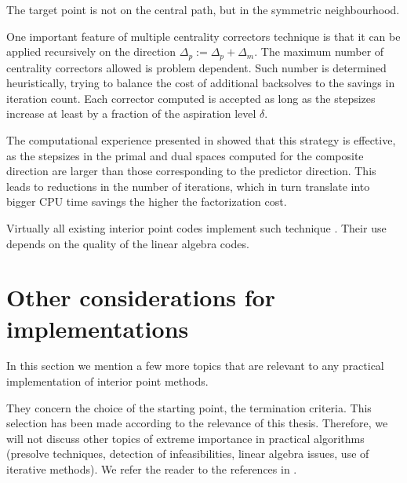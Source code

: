 The target point is not on the central path, but in the symmetric
neighbourhood.

One important feature of multiple centrality correctors technique
is that it can be applied recursively on the direction 
$\Delta_p := \Delta_p + \Delta_m$.
The maximum number of centrality correctors allowed is
problem dependent. Such number is determined 
heuristically, trying to balance the cost of additional backsolves to 
the savings in iteration count.
Each corrector computed is accepted as long as the stepsizes increase 
at least by a fraction of the aspiration level $\delta$.


The computational experience presented in \cite{Gondzio96} showed 
that this strategy is effective, as the stepsizes in the primal and 
dual spaces computed for the composite direction are larger than 
those corresponding to the predictor direction. 
This leads to reductions in the number of iterations, which in turn 
translate into bigger CPU time savings the higher the factorization
cost.

Virtually all existing interior point codes implement such technique 
\cite[Appendix B]{ipm:Wright97}.
Their use depends on the quality of the linear algebra codes.

%
%
\section{Other considerations for implementations}

In this section we mention a few more topics that are relevant to any 
practical implementation of interior point methods.

They concern the choice of the starting point, the termination
criteria. This selection has been made according to the relevance
of this thesis.
Therefore, we will not discuss other topics of extreme importance 
in practical algorithms (presolve techniques, detection of infeasibilities, 
linear algebra issues, use of iterative methods).
We refer the reader to the references in 
\cite{AndersenGondzioMeszarosXu,GondzioTerlaky}.


%
%
